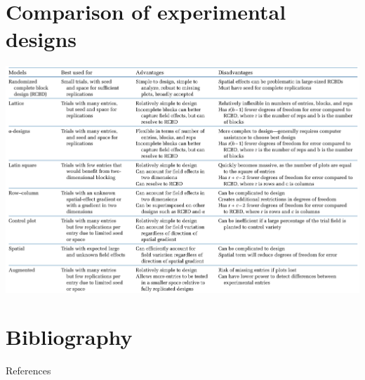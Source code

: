 \documentclass[
  ignorenonframetext,
  aspectratio=169]{beamer}
\begin{document}
\begin{frame}{}
\protect\hypertarget{section-17}{}
\end{frame}

\hypertarget{comparison-of-experimental-designs}{%
\section{Comparison of experimental
designs}\label{comparison-of-experimental-designs}}

\begin{frame}{}
\protect\hypertarget{section-18}{}
\begin{center}\includegraphics[width=0.7\linewidth]{./images/experimental-designs-comparison} \end{center}
\end{frame}

\hypertarget{bibliography}{%
\section{Bibliography}\label{bibliography}}

\begin{frame}{References}
\protect\hypertarget{references}{}
\end{frame}
\end{document}
